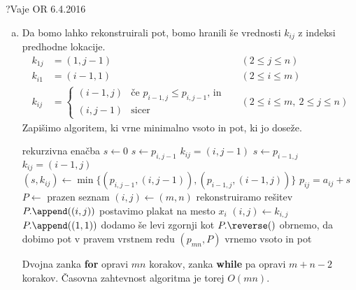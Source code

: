 \begin{naloga}{?}{Vaje OR 6.4.2016}
\begin{odgovor}
\begin{enumerate}[(a)]
\item Da bomo lahko rekonstruirali pot,
bomo hranili še vrednosti $k_{ij}$ z indeksi predhodne lokacije.
\begin{align*}
k_{1j} &= (1, j-1) && (2 \le j \le n) \\
k_{i1} &= (i-1, 1) && (2 \le i \le m) \\
k_{ij} &= \begin{cases}
(i-1, j) & \text{če $p_{i-1,j} \le p_{i,j-1}$, in} \\
(i, j-1) & \text{sicer}
\end{cases}
&& (2 \le i \le m, \ 2 \le j \le n)
\end{align*}
Zapišimo algoritem, ki vrne minimalno vsoto in pot, ki jo doseže.
\begin{small}
\begin{algorithmic}
             \hfill rekurzivna enačba
                \State $s \gets 0$
                \State $s \gets p_{i,j-1}$
                \State $k_{ij} = (i, j-1)$
                \State $s \gets p_{i-1,j}$
                \State $k_{ij} = (i-1, j)$
            \Else
                \State $(s, k_{ij}) \gets \min\{(p_{i,j-1}, (i, j-1)),
                                                (p_{i-1,j}, (i-1, j))\}$
            \EndIf
            \State $p_{ij} = a_{ij} + s$
        \EndFor
    \EndFor
    \State $P \gets$ prazen seznam
    \State $(i, j) \gets (m, n)$
     \hfill rekonstruiramo rešitev
        \State $P.\append((i, j))$ \hfill postavimo plakat na mesto $x_i$
        \State $(i, j) \gets k_{i, j}$
    \EndWhile
    \State $P.\append((1, 1))$ \hfill dodamo še levi zgornji kot
    \State $P.\reverse()$ \hfill obrnemo, da dobimo pot v pravem vrstnem redu
    \State \Return $(p_{mn}, P)$ \hfill vrnemo vsoto in pot
\EndFunction
\end{algorithmic}
\end{small}
Dvojna zanka {\bf for} opravi $mn$ korakov,
zanka {\bf while} pa opravi $m+n-2$ korakov.
Časovna zahtevnost algoritma je torej $O(mn)$.
\end{enumerate}
\end{odgovor}
\end{naloga}

